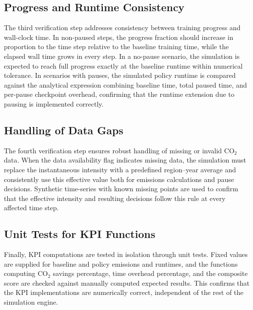 \subsection{Progress and Runtime Consistency}

The third verification step addresses consistency between training progress
and wall-clock time. In non-paused steps, the progress fraction should
increase in proportion to the time step relative to the baseline training
time, while the elapsed wall time grows in every step. In a no-pause
scenario, the simulation is expected to reach full progress exactly at the
baseline runtime within numerical tolerance. In scenarios with pauses, the
simulated policy runtime is compared against the analytical expression
combining baseline time, total paused time, and per-pause checkpoint
overhead, confirming that the runtime extension due to pausing is implemented
correctly.

\subsection{Handling of Data Gaps}

The fourth verification step ensures robust handling of missing or invalid
CO$_2$ data. When the data availability flag indicates missing data, the
simulation must replace the instantaneous intensity with a predefined
region–year average and consistently use this effective value both for
emissions calculations and pause decisions. Synthetic time-series with known
missing points are used to confirm that the effective intensity and resulting
decisions follow this rule at every affected time step.

\subsection{Unit Tests for KPI Functions}

Finally, KPI computations are tested in isolation through unit tests. Fixed
values are supplied for baseline and policy emissions and runtimes, and the
functions computing CO$_2$ savings percentage, time overhead percentage, and
the composite score are checked against manually computed expected results.
This confirms that the KPI implementations are numerically correct,
independent of the rest of the simulation engine.